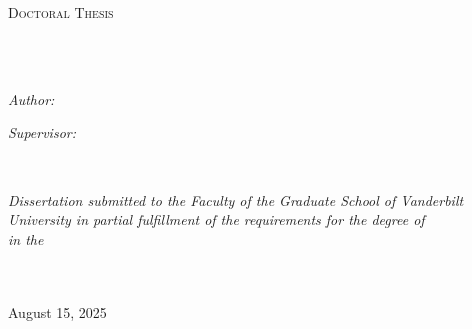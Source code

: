 \documentclass[
  letterpaper,
  11pt,
  english,
  singlespacing,
  headsepline]{MastersDoctoralThesis}
\author{Jordan B
Gunn} %
\begin{document}
\frontmatter %

\pagestyle{plain} %


\begin{titlepage}
\begin{center}

\vspace*{.06\textheight}
{\scshape\LARGE \univname\par}\vspace{1.5cm} %
\textsc{\Large Doctoral Thesis}\\[0.5cm] %

\HRule \\[0.4cm] %
{\huge \bfseries \ttitle\par}\vspace{0.4cm} %
\HRule \\[1.5cm] %
 
\begin{minipage}[t]{0.4\textwidth}
\begin{flushleft} \large
\emph{Author:}\\
\authorname
\end{flushleft}
\end{minipage}
\begin{minipage}[t]{0.4\textwidth}
\begin{flushright} \large
\emph{Supervisor:} \\
%
\supname

\end{flushright}
\end{minipage}\\[3cm]
 
\vfill

\large \textit{Dissertation submitted to the Faculty of the Graduate School of Vanderbilt University in partial fulfillment of the requirements for the degree of \degreename}\\[0.3cm] %
\textit{in the}\\[0.4cm]
\groupname\\
\deptname\\[2cm] %
 
\vfill


{\large August 15, 2025}\\[4cm] %

 
\vfill
\end{center}
\end{titlepage}
\end{document}
